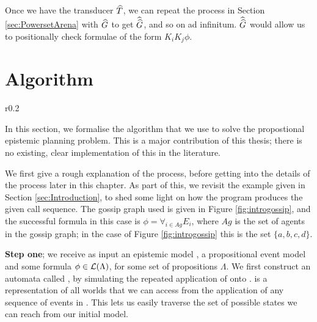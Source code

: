 \documentclass[10pt, a4paper]{report}
\begin{document}
Once we have the transducer $\widehat{T}$, we can repeat the process in Section
\ref{sec:PowersetArena} with $\widehat{G}$ to get $\widehat{\widehat{G}}$, and so on ad
infinitum. $\widehat{\widehat{G}}$ would allow us to positionally check formulae of the
form $K_i K_j \phi$.

\newpage

\chapter{Algorithm}

\begin{wrapfigure}{r}{0.2\textwidth}
  \centering
  \caption{}
  \label{fig:introgossip}
\end{wrapfigure}

In this section, we formalise the algorithm that we use to solve the
propostional epistemic planning problem. This is a major contribution of this
thesis; there is no existing, clear implementation of this in the literature.

We first give a rough explanation of the process, before getting into the
details of the process later in this chapter. As part of this, we revisit the
example given in Section \ref{sec:Introduction}, to shed some light on how the
program produces the given call sequence. The gossip graph used is given in
Figure \ref{fig:introgossip}, and the successful formula in this case is $\phi =
\forall_{i \in Ag} E_i$, where $Ag$ is the set of agents in the gossip graph; in
the case of Figure \ref{fig:introgossip} this is the set $\{a, b, c, d\}$. 

\textbf{Step one}; we receive as input an epistemic model , a
propositional event model  and some formula $\phi \in \mathcal{L}(\Lambda)$,
for some set of propositions $\Lambda$. We first construct an automata called
\mestar, by simulating the repeated application of  onto . \mestar
is a representation of all worlds that we can access from the application of any
sequence of events in . This lets us easily traverse the set of possible
states we can reach from our initial model.
\end{document}
